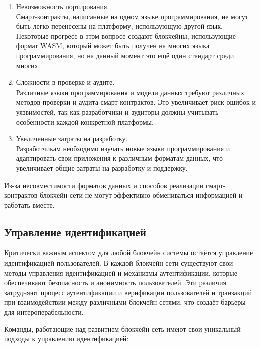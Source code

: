 \begin{enumerate}
	\item Невозможность портирования.\\
	Смарт-контракты, написанные на одном языке программирования, не могут быть легко перенесены на платформу, использующую другой язык. Некоторые прогресс в этом вопросе создают блокчейны, использующие формат WASM, который может быть получен на многих языка программирования, но на данный момент это ещё один стандарт среди многих.

	\item Сложности в проверке и аудите.\\
	Различные языки программирования и модели данных требуют различных методов проверки и аудита смарт-контрактов. Это увеличивает риск ошибок и уязвимостей, так как разработчики и аудиторы должны учитывать особенности каждой конкретной платформы.

	\item Увеличенные затраты на разработку.\\
	Разработчикам необходимо изучать новые языки программирования и адаптировать свои приложения к различным форматам данных, что увеличивает общие затраты на разработку и поддержку.
\end{enumerate}

Из-за несовместимости форматов данных и способов реализации смарт-контрактов блокчейн-сети не могут эффективно обмениваться информацией и работать вместе.

\subsection{Управление идентификацией}

Критически важным аспектом для любой блокчейн системы остаётся управление идентификацией пользователей. В каждой блокчейн сети существуют свои методы управления идентификацией и механизмы аутентификации, которые обеспечивают безопасность и анонимность пользователей. Эти различия затрудняют процесс аутентификации и верификации пользователей и транзакций при взаимодействии между различными блокчейн сетями, что создаёт барьеры для интероперабельности.

Команды, работающие над развитием блокчейн-сеть имеют свои уникальный подходы к управлению идентификацией:

